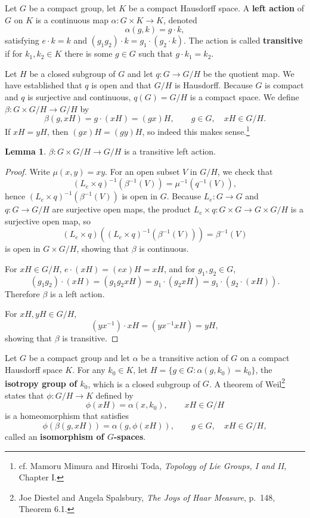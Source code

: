 \documentclass{article}
\theoremstyle{definition}
\newtheorem{lemma}[theorem]{Lemma}
\theoremstyle{definition}
\begin{document}
Let $G$ be a compact  group, let $K$ be a compact Hausdorff space. A \textbf{left action} of $G$ on $K$ is a continuous map
$\alpha:G \times K \to K$, denoted
\[
\alpha(g,k)=g\cdot k,
\]
 satisfying $e\cdot k = k$ and 
$(g_1g_2) \cdot k = g_1 \cdot (g_2 \cdot k)$. The action is called \textbf{transitive} if for $k_1,k_2 \in K$ there is some $g \in G$ such that
$g\cdot k_1=k_2$. 



Let $H$ be a closed subgroup of $G$ and let $q:G \to G/H$ be the quotient map.
We have established that $q$ is open and that $G/H$ is Hausdorff. 
Because
$G$ is compact and $q$ is surjective and continuous, $q(G)=G/H$ is a compact space. 
We define $\beta:G \times G/H \to G/H$ by
\[
\beta(g,xH) = g\cdot (xH) = (gx)H,\qquad g \in G,\quad xH \in G/H.
\]
If $xH=yH$, then $(gx)H=(gy)H$, so indeed this makes sense.\footnote{cf. 
Mamoru Mimura and Hiroshi Toda, {\em Topology of Lie Groups, I and II},
Chapter I.}


\begin{lemma}
$\beta:G \times G/H \to G/H$
is a transitive left action. 
\label{homogeneous}
\end{lemma}
\begin{proof}
Write $\mu(x,y)=xy$. 
For an open subset $V$ in $G/H$, we check that
\[
(L_e \times q)^{-1}(\beta^{-1}(V)) = \mu^{-1} (q^{-1}(V)),
\]
hence $(L_e \times q)^{-1}(\beta^{-1}(V))$ is open in $G$. 
Because $L_e:G \to G$ and $q:G \to G/H$ are surjective open maps, the product
$L_e \times q:G \times G \to G \times G/H$ is a surjective open map, so
\[
(L_e \times q)((L_e \times q)^{-1}(\beta^{-1}(V))) = \beta^{-1}(V)
\]
is open in $G \times G/H$, showing that $\beta$ is continuous. 

For $xH \in G/H$,  $e\cdot (xH) = (ex)H = xH$, and for $g_1,g_2 \in G$,
\[
(g_1 g_2) \cdot (xH) = (g_1g_2 xH) = g_1 \cdot (g_2 xH)
=g_1 \cdot (g_2 \cdot (xH)).
\]
Therefore $\beta$ is a left action. 

For $xH,yH \in G/H$, 
\[
(yx^{-1}) \cdot xH = (yx^{-1}xH) = yH,
\]
showing that $\beta$ is transitive.
\end{proof}


Let $G$ be a compact group and let $\alpha$ be a transitive action of $G$ on a
compact Hausdorff space $K$. For any $k_0 \in K$, let $H=\{g \in G: \alpha(g,k_0)=k_0\}$, the
\textbf{isotropy group of $k_0$}, which is a closed subgroup of $G$.
A theorem of Weil\footnote{Joe Diestel and Angela Spalsbury, {\em The Joys of Haar Measure},
p.~148, Theorem 6.1.} states that
$\phi:G/H \to K$ defined by
\[
\phi(xH) = \alpha(x,k_0),\qquad xH \in G/H
\]
is a homeomorphism that satisfies
\[
\phi ( \beta(g,xH)) = \alpha(g,\phi(xH)),\qquad g \in G,\quad xH \in G/H,
\]
called an \textbf{isomorphism of $G$-spaces}.
\end{document}
